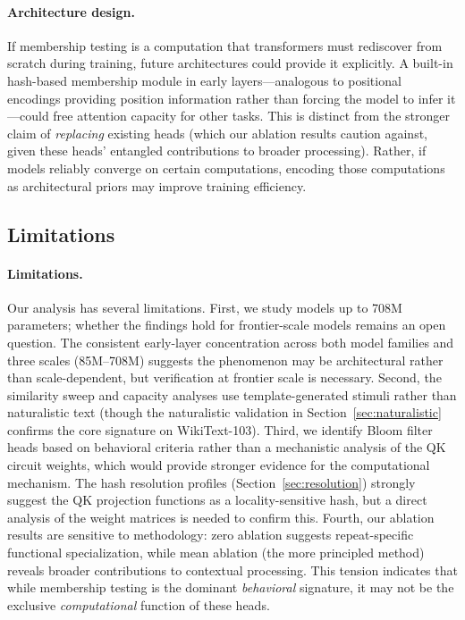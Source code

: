 \documentclass[11pt]{article}
\begin{document}
\paragraph{Architecture design.} If membership testing is a computation that transformers must rediscover from scratch during training, future architectures could provide it explicitly. A built-in hash-based membership module in early layers---analogous to positional encodings providing position information rather than forcing the model to infer it---could free attention capacity for other tasks. This is distinct from the stronger claim of \emph{replacing} existing heads (which our ablation results caution against, given these heads' entangled contributions to broader processing). Rather, if models reliably converge on certain computations, encoding those computations as architectural priors may improve training efficiency.

\subsection{Limitations}

\paragraph{Limitations.}
\label{sec:limitations}
Our analysis has several limitations. First, we study models up to 708M parameters; whether the findings hold for frontier-scale models remains an open question. The consistent early-layer concentration across both model families and three scales (85M--708M) suggests the phenomenon may be architectural rather than scale-dependent, but verification at frontier scale is necessary. Second, the similarity sweep and capacity analyses use template-generated stimuli rather than naturalistic text (though the naturalistic validation in Section~\ref{sec:naturalistic} confirms the core signature on WikiText-103). Third, we identify Bloom filter heads based on behavioral criteria rather than a mechanistic analysis of the QK circuit weights, which would provide stronger evidence for the computational mechanism. The hash resolution profiles (Section~\ref{sec:resolution}) strongly suggest the QK projection functions as a locality-sensitive hash, but a direct analysis of the weight matrices is needed to confirm this. Fourth, our ablation results are sensitive to methodology: zero ablation suggests repeat-specific functional specialization, while mean ablation (the more principled method) reveals broader contributions to contextual processing. This tension indicates that while membership testing is the dominant \emph{behavioral} signature, it may not be the exclusive \emph{computational} function of these heads.
\end{document}
